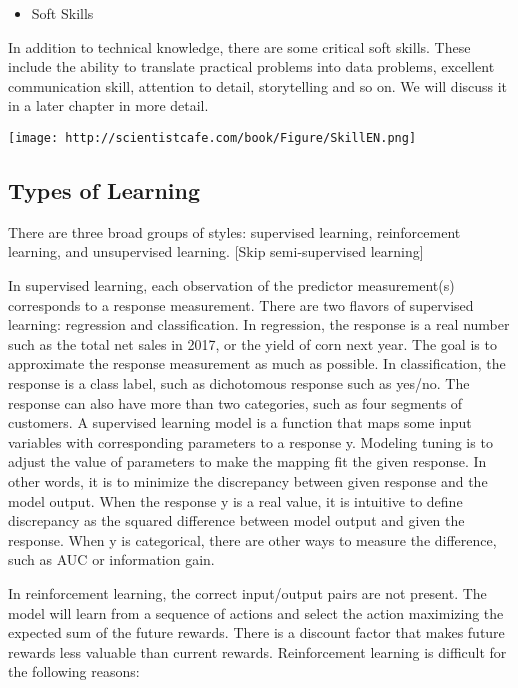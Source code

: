 \documentclass[
]{article}
\providecommand{\tightlist}{%
  \setlength{\itemsep}{0pt}\setlength{\parskip}{0pt}}
\begin{document}
\begin{itemize}
\tightlist
\item
  Soft Skills
\end{itemize}

In addition to technical knowledge, there are some critical soft skills.
These include the ability to translate practical problems into data
problems, excellent communication skill, attention to detail,
storytelling and so on. We will discuss it in a later chapter in more
detail.

\texttt{[image: http://scientistcafe.com/book/Figure/SkillEN.png]}

\hypertarget{types-of-learning}{%
\subsection{Types of Learning}\label{types-of-learning}}

There are three broad groups of styles: supervised learning,
reinforcement learning, and unsupervised learning. {[}Skip
semi-supervised learning{]}

In supervised learning, each observation of the predictor measurement(s)
corresponds to a response measurement. There are two flavors of
supervised learning: regression and classification. In regression, the
response is a real number such as the total net sales in 2017, or the
yield of corn next year. The goal is to approximate the response
measurement as much as possible. In classification, the response is a
class label, such as dichotomous response such as yes/no. The response
can also have more than two categories, such as four segments of
customers. A supervised learning model is a function that maps some
input variables with corresponding parameters to a response y. Modeling
tuning is to adjust the value of parameters to make the mapping fit the
given response. In other words, it is to minimize the discrepancy
between given response and the model output. When the response y is a
real value, it is intuitive to define discrepancy as the squared
difference between model output and given the response. When y is
categorical, there are other ways to measure the difference, such as AUC
or information gain.

In reinforcement learning, the correct input/output pairs are not
present. The model will learn from a sequence of actions and select the
action maximizing the expected sum of the future rewards. There is a
discount factor that makes future rewards less valuable than current
rewards. Reinforcement learning is difficult for the following reasons:
\end{document}
